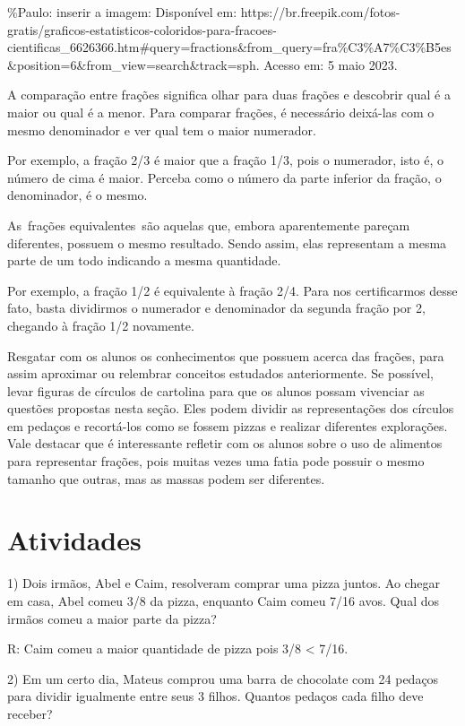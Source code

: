 \%Paulo: inserir a imagem: Disponível em:
https://br.freepik.com/fotos-gratis/graficos-estatisticos-coloridos-para-fracoes-cientificas\_6626366.htm\#query=fractions\&from\_query=fra\%C3\%A7\%C3\%B5es\&position=6\&from\_view=search\&track=sph.
Acesso em: 5 maio 2023.

A comparação entre frações significa olhar para duas frações e descobrir
qual é a maior ou qual é a menor. Para comparar frações, é necessário
deixá-las com o mesmo denominador e ver qual tem o maior numerador.

Por exemplo, a fração 2/3 é maior que a fração 1/3, pois o numerador,
isto é, o número de cima é maior. Perceba como o número da parte
inferior da fração, o denominador, é o mesmo.

As~frações equivalentes~são aquelas que, embora aparentemente pareçam
diferentes, possuem o mesmo resultado. Sendo assim, elas representam a
mesma parte de um todo indicando a mesma quantidade.

Por exemplo, a fração 1/2 é equivalente à fração 2/4. Para nos
certificarmos desse fato, basta dividirmos o numerador e denominador da
segunda fração por 2, chegando à fração 1/2 novamente.

Resgatar com os alunos os conhecimentos que possuem acerca das frações,
para assim aproximar ou relembrar conceitos estudados anteriormente. Se
possível, levar figuras de círculos de cartolina para que os alunos
possam vivenciar as questões propostas nesta seção. Eles podem dividir
as representações dos círculos em pedaços e recortá-los como se fossem
pizzas e realizar diferentes explorações. Vale destacar que é
interessante refletir com os alunos sobre o uso de alimentos para
representar frações, pois muitas vezes uma fatia pode possuir o mesmo
tamanho que outras, mas as massas podem ser diferentes.

\section{Atividades}

1) Dois irmãos, Abel e Caim, resolveram comprar uma pizza juntos. Ao
chegar em casa, Abel comeu 3/8 da pizza, enquanto Caim comeu 7/16 avos.
Qual dos irmãos comeu a maior parte da pizza?

R: Caim comeu a maior quantidade de pizza pois 3/8 \textless{} 7/16.

2) Em um certo dia, Mateus comprou uma barra de chocolate com 24 pedaços
para dividir igualmente entre seus 3 filhos. Quantos pedaços cada filho
deve receber?

